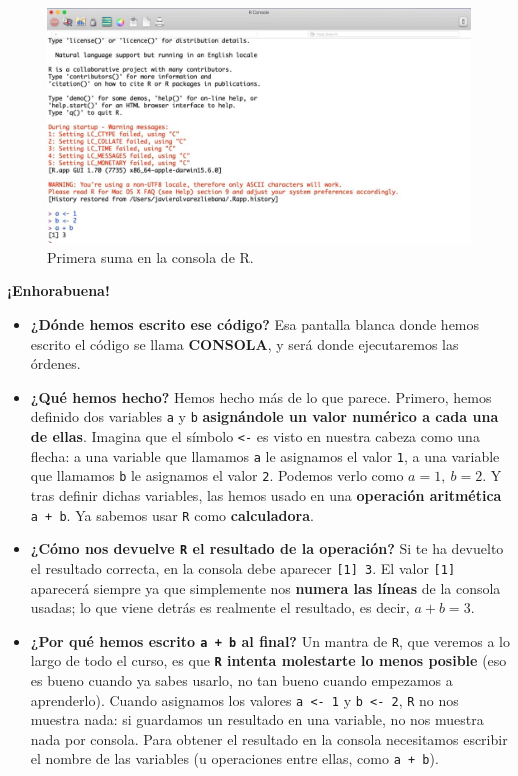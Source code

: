 \documentclass[11pt,]{book}
\begin{document}
\begin{figure}

{\centering \includegraphics[width=0.9\linewidth]{./img/primera_suma} 

}

\caption{Primera suma en la consola de R.}\label{fig:primera-suma}
\end{figure}

\textbf{¡Enhorabuena!}

\begin{itemize}
\item
  \textbf{¿Dónde hemos escrito ese código?} Esa pantalla blanca donde hemos escrito el código se llama \textbf{CONSOLA}, y será donde ejecutaremos las órdenes.
\item
  \textbf{¿Qué hemos hecho?} Hemos hecho más de lo que parece. Primero, hemos definido dos variables \texttt{a} y \texttt{b} \textbf{asignándole un valor numérico a cada una de ellas}. Imagina que el símbolo \texttt{\textless{}-} es visto en nuestra cabeza como una flecha: a una variable que llamamos \texttt{a} le asignamos el valor \texttt{1}, a una variable que llamamos \texttt{b} le asignamos el valor \texttt{2}. Podemos verlo como \(a = 1,~b = 2\). Y tras definir dichas variables, las hemos usado en una \textbf{operación aritmética} \texttt{a\ +\ b}. Ya sabemos usar \texttt{R} como \textbf{calculadora}.
\item
  \textbf{¿Cómo nos devuelve \texttt{R} el resultado de la operación?} Si te ha devuelto el resultado correcta, en la consola debe aparecer \texttt{{[}1{]}\ 3}. El valor \texttt{{[}1{]}} aparecerá siempre ya que simplemente nos \textbf{numera las líneas} de la consola usadas; lo que viene detrás es realmente el resultado, es decir, \(a + b = 3\).
\item
  \textbf{¿Por qué hemos escrito \texttt{a\ +\ b} al final?} Un mantra de \texttt{R}, que veremos a lo largo de todo el curso, es que \textbf{\texttt{R} intenta molestarte lo menos posible} (eso es bueno cuando ya sabes usarlo, no tan bueno cuando empezamos a aprenderlo). Cuando asignamos los valores \texttt{a\ \textless{}-\ 1} y \texttt{b\ \textless{}-\ 2}, \texttt{R} no nos muestra nada: si guardamos un resultado en una variable, no nos muestra nada por consola. Para obtener el resultado en la consola necesitamos escribir el nombre de las variables (u operaciones entre ellas, como \texttt{a\ +\ b}).
\end{itemize}
\end{document}
